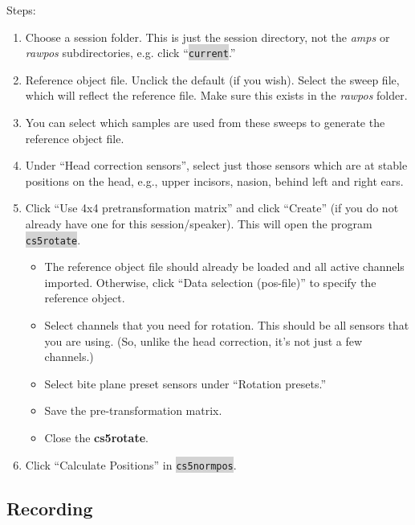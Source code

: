 \documentclass[12pt]{article}
\begin{document}
    Steps:
    \begin{enumerate}
        \item Choose a session folder. This is just the session directory, not the \emph{amps} or \emph{rawpos} subdirectories, e.g. click ``\colorbox{lightgray}{\texttt{current}}.''
        \item Reference object file. Unclick the default (if you wish). Select the sweep file, which will reflect the reference file. Make sure this exists in the \emph{rawpos} folder.
        \item You can select which samples are used from these sweeps to generate the reference object file.
        \item Under “Head correction sensors”, select just those sensors which are at stable positions on the head, e.g., upper incisors, nasion, behind left and right ears.
        \item Click “Use 4x4 pretransformation matrix” and click “Create” (if you do not already have one for this session/speaker). This will open the program \colorbox{lightgray}{\texttt{cs5rotate}}.
        
        \begin{itemize}
            \item The reference object file should already be loaded and all active channels imported. Otherwise, click “Data selection (pos-file)” to specify the reference object. 
            \item Select channels that you need for rotation. This should be all sensors that you are using. (So, unlike the head correction, it’s not just a few channels.)
            \item Select bite plane preset sensors under “Rotation presets.”
            \item Save the pre-transformation matrix.
            \item Close the \textbf{cs5rotate}.
        \end{itemize}
        
        \item Click “Calculate Positions” in \colorbox{lightgray}{\texttt{cs5normpos}}.
    \end{enumerate}

\subsection{Recording}
\end{document}
